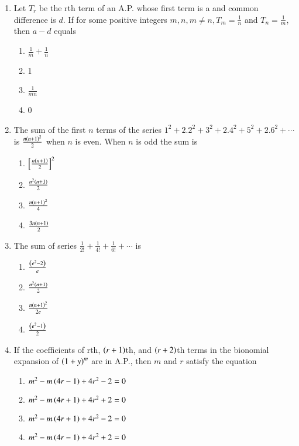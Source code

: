\documentclass[journal,12pt,twocolumn]{IEEEtran}
\theoremstyle{remark}
\begin{document}
\begin{enumerate}[label={\arabic*.}]
\item {Let $T_r$ be the rth term of an A.P. whose first term is a and common difference is $d$. If for some positive integers $m,n, m\neq n, T_m = \frac{1}{n}$ and $T_n = \frac{1}{m}$, then $a-d$ equals} 
{\hfill{}}
\begin{enumerate}[label={\brak{\alph*}}]
\item  {$\frac{1}{m}+\frac{1}{n}$}
\item  {1}
\item  {$\frac{1}{mn}$}
\item  {0}
\end{enumerate}

\item {The sum of the first $n$ terms of the series $1^2+2.2^2+3^2+2.4^2+5^2+2.6^2+\cdots$ is $\frac{n\left(n+1\right)^2}{2}$ when $n$ is even. When $n$ is odd the sum is}
{\hfill{}}
\begin{enumerate}[label={\brak{\alph*}}]
\item  {$\left[\frac{n\left(n+1\right)}{2}\right]^2$}
\item  {$\frac{n^2\left(n+1\right)}{2}$}
\item  {$\frac{n\left(n+1\right)^2}{4}$}
\item  {$\frac{3n\left(n+1\right)}{2}$}
\end{enumerate}

\item {The sum of series $\frac{1}{2!}+\frac{1}{4!}+\frac{1}{6!}+\cdots$ is}
{\hfill{}} 
\begin{enumerate}[label={\brak{\alph*}}]
\item  {$\frac{\left(e^2-2\right)}{e}$}
\item  {$\frac{n^2\left(n+1\right)}{2}$}
\item  {$\frac{n\left(n+1\right)^2}{2e}$}
\item  {$\frac{\left(e^2-1\right)}{2}$}
\end{enumerate}

\item {If the coefficients of rth, $\left(r+1\right)$th, and $\left(r+2\right)$th terms in the bionomial expansion of $\left(1+y\right)^m$ are in A.P., then $m$ and $r$ satisfy the equation}

{\hfill{}} 
\begin{enumerate}[label={\brak{\alph*}}]
\item  {$m^2-m\left(4r-1\right)+4r^2-2=0$}
\item  {$m^2-m\left(4r+1\right)+4r^2+2=0$}
\item  {$m^2-m\left(4r+1\right)+4r^2-2=0$}
\item  {$m^2-m\left(4r-1\right)+4r^2+2=0$}
\end{enumerate}


\end{enumerate}
\end{document}
